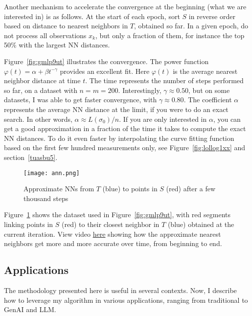 \documentclass[oneside,10pt]{book}
\begin{document}
Another mechanism to accelerate the convergence at the beginning (what we are interested in) is as follows. At the start of each epoch, sort $S$ in reverse order based on distance to nearest neighbors in $T$, obtained so far. In a given epoch, do not process all
 observations $x_k$, but only a fraction of them, for instance the top 50\% with the largest NN distances. 

Figure~\ref{fig:gmlp9ut} illustrates the convergence. The power function $\varphi(t) = \alpha + \beta t^{-\gamma}$ provides an excellent fit. Here $\varphi(t)$ is the average nearest neighbor distance at time $t$. The time represents the number of steps performed so far, on a dataset with $n=m=200$. Interestingly, $\gamma \approx 0.50$, but on some datasets, I was able to get faster convergence, with $\gamma\approx 0.80$. The coefficient $\alpha$ represents the 
 average NN distance at the limit, if you were to do an exact search. In other words,
$\alpha \approx L(\sigma_0)/n$. If you are only interested in $\alpha$, you can get a good approximation
 in a fraction of the time it takes to compute the exact NN distances. To do it even faster by 
 interpolating the curve fitting function based on the first few hundred measurements only, see
 Figure~\ref{fig:lollog1xx} and section~\ref{tuasbu5}.



\begin{figure}[H]
\centering
\texttt{[image: ann.png]}
\caption{Approximate NNs from $T$ (blue) to points in $S$ (red) after a few thousand steps}
\label{fig:wasfmlp9ut}
\end{figure}

Figure~\ref{fig:wasfmlp9ut} shows the dataset used in Figure~\ref{fig:gmlp9ut}, with red segments linking points in $S$ (red) to their closest neighbor in $T$ (blue) obtained at the current iteration. View video 
\href{https://youtu.be/ORNIx_rBTrQ}{here}  showing
 how the approximate nearest neighbors get more and more accurate over time,  from beginning to end.

\subsection{Applications}

The methodology presented here is useful in several contexts. Now, I describe how to leverage my algorithm in various applications, ranging from traditional to GenAI and LLM. 
\end{document}
